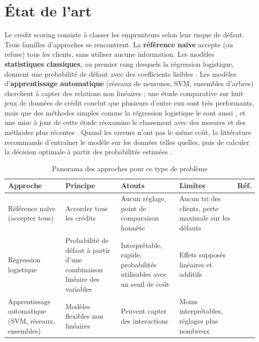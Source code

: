 \documentclass[11pt,a4paper]{article}
\begin{document}
\section{État de l'art}
\label{sec:etat}
Le credit scoring consiste à classer les emprunteurs selon leur risque de défaut. Trois familles d'approches se rencontrent. La \textbf{référence naïve} accepte (ou refuse) tous les clients, sans utiliser aucune information. Les modèles \textbf{statistiques classiques}, au premier rang desquels la régression logistique, donnent une probabilité de défaut avec des coefficients lisibles \cite{hosmer}. Les modèles d'\textbf{apprentissage automatique} (réseaux de neurones, SVM, ensembles d'arbres) cherchent à capter des relations non linéaires ; une étude comparative sur huit jeux de données de crédit conclut que plusieurs d'entre eux sont très performants, mais que des méthodes simples comme la régression logistique le sont aussi \cite{baesens}, et une mise à jour de cette étude réexamine le classement avec des mesures et des méthodes plus récentes \cite{lessmann}. Quand les erreurs n'ont pas le même coût, la littérature recommande d'entraîner le modèle sur les données telles quelles, puis de calculer la décision optimale à partir des probabilités estimées \cite{elkan}.

\begin{table}[htbp]
  \centering
  \caption{Panorama des approches pour ce type de problème}
  \label{tab:etat}
  \small
  \begin{tabular}{@{}P{3cm} P{4.3cm} P{3.5cm} P{3.5cm} l@{}}
    \toprule
    Approche & Principe & Atouts & Limites & Réf. \\
    \midrule
    Référence naïve (accepter tous) & Accorder tous les crédits & Aucun réglage, point de comparaison honnête & Aucun tri des clients, perte maximale sur les défauts & \cite{elkan} \\
    Régression logistique & Probabilité de défaut à partir d'une combinaison linéaire des variables & Interprétable, rapide, probabilités utilisables avec un seuil de coût & Effets supposés linéaires et additifs & \cite{hosmer,baesens} \\
    Apprentissage automatique (SVM, réseaux, ensembles) & Modèles flexibles non linéaires & Peuvent capter des interactions & Moins interprétables, réglages plus nombreux & \cite{baesens,lessmann} \\
    \bottomrule
  \end{tabular}
\end{table}
\end{document}
